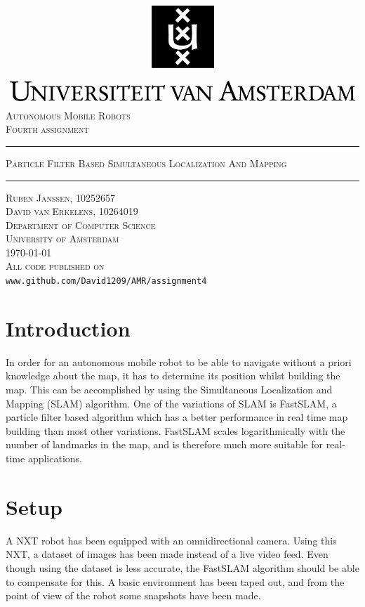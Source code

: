 \documentclass[12pt]{article}
\begin{document}
\begin{titlepage}
\begin{center}
    \includegraphics[width=\textwidth]{./logo.png}
    \\ [2.5cm]
    \textsc{\Large Autonomous Mobile Robots}
    \\ [0.5cm]
    \textsc{\large Fourth assignment}
    \\ [1cm]
    \hrule
    \vspace{0.3cm}
    \textsc{Particle Filter Based Simultaneous Localization And Mapping}
    \\ [0.3cm]
    \hrule
    \vfill
    \textsc{Ruben Janssen, 10252657 \\ David van Erkelens, 10264019 \\[0.7cm] Department of Computer Science \\ University of Amsterdam \\[0.3cm] \today \\[0.5cm] All code published on}
    \\
    \verb|www.github.com/David1209/AMR/assignment4|
\end{center}
\end{titlepage}
\tableofcontents
\clearpage
\section{Introduction}
In order for an autonomous mobile robot to be able to navigate without a priori knowledge about the map, it has to determine its position whilst building the map. This can be accomplished by using the Simultaneous Localization and Mapping (SLAM) algorithm. One of the variations of SLAM is FastSLAM, a particle filter based algorithm which has a better performance in real time map building than most other variations. FastSLAM scales logarithmically with the number of landmarks in the map, and is therefore much more suitable for real-time applications.

\section{Setup}
A NXT robot has been equipped with an omnidirectional camera. Using this NXT, a dataset of images has been made instead of a live video feed. Even though using the dataset is less accurate, the FastSLAM algorithm should be able to compensate for this. A basic environment has been taped out, and from the point of view of the robot some snapshots have been made. 
\end{document}

